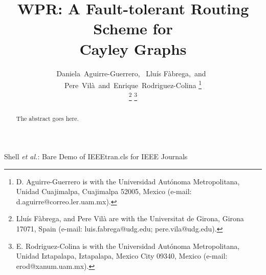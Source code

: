 \documentclass[journal]{IEEEtran}
\begin{document}
 
\title{WPR: A Fault-tolerant Routing Scheme for\\Cayley Graphs}

\author{Daniela~Aguirre-Guerrero,~
        Llu\'is F\`abrega,~and~
        Pere~Vil\`a~and~Enrique~Rodriguez-Colina%
\thanks{D. Aguirre-Guerrero is with the Universidad Aut\'onoma Metropolitana, Unidad Cuajimalpa, Cuajimalpa 52005, Mexico (e-mail: d.aguirre@correo.ler.uam.mx).}

\thanks{Llu\'is F\`abrega, 
        and Pere Vil\`a are with the Universitat de Girona, Girona 17071, Spain (e-mail: luis.fabrega@udg.edu; pere.vila@udg.edu).}
\thanks{E. Rodriguez-Colina is with the Universidad Aut\'onoma Metropolitana, Unidad Iztapalapa, Iztapalapa, Mexico City 09340, Mexico (e-mail: erod@xanum.uam.mx).}%
}

% 
%



%
{Shell \MakeLowercase{\textit{et al.}}: Bare Demo of IEEEtran.cls for IEEE Journals}
 
\maketitle
 
\begin{abstract}
The abstract goes here.
\end{abstract}
\end{document}
